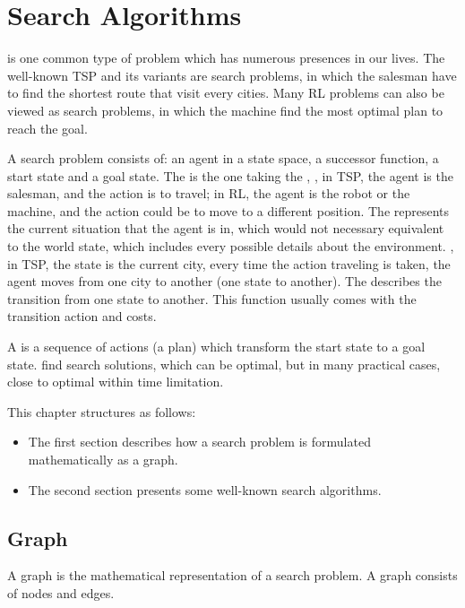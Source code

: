 \chapter{Search Algorithms}

 is one common type of problem which has numerous presences in our lives. The well-known \ac{TSP} and its variants are search problems, in which the salesman have to find the shortest route that visit every cities. Many \ac{RL} problems can also be viewed as search problems, in which the machine find the most optimal plan to reach the goal.

A search problem consists of: an agent in a state space, a successor function, a start state and a goal state. The  is the one taking the , \eg, in \ac{TSP}, the agent is the salesman, and the action is to travel; in \ac{RL}, the agent is the robot or the machine, and the action could be to move to a different position. The  represents the current situation that the agent is in, which would not necessary equivalent to the world state, which includes every possible details about the environment. \Eg, in \ac{TSP}, the state is the current city, every time the action traveling is taken, the agent moves from one city to another (one state to another). The  describes the transition from one state to another. This function usually comes with the transition action and costs.

A  is a sequence of actions (a plan) which transform the start state to a goal state.  find search solutions, which can be optimal, but in many practical cases, close to optimal within time limitation.

This chapter structures as follows:
\begin{itemize}
	\item The first section describes how a search problem is formulated mathematically as a graph.
	\item The second section presents some well-known search algorithms.
\end{itemize}

\section{Graph}

A graph is the mathematical representation of a search problem. A graph consists of nodes and edges.

